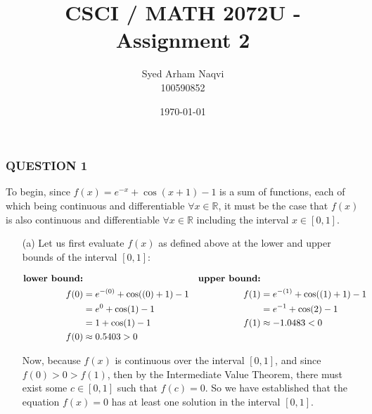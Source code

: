 \documentclass{article}
\title{CSCI / MATH 2072U - Assignment 2}
\author{Syed Arham Naqvi \\ \small{100590852}}
\date{\today}
\begin{document}
\maketitle


\subsubsection*{QUESTION 1}

To begin, since $f(x)=e^{-x}+\cos(x+1)-1$ is a sum of functions, each of which being continuous and differentiable
$\forall x \in \mathbb{R}$, it must be the case that $f(x)$ is also continuous and differentiable $\forall x \in \mathbb{R}$
including the interval $x\in[0,1]$.

\begin{enumerate}

    \item[(a)]  Let us first evaluate $f(x)$ as defined above at the lower and upper bounds of the interval $[0,1]$:

                \begin{align*}
                    \begin{split}
                        \textbf{lower bound:}           \\
                        f(0) &= e^{-(0)}+\cos((0)+1)-1          \\
                             &= e^{0}+\cos(1)-1                 \\
                             &= 1+\cos(1)-1                     \\
                        f(0) &\approx 0.5403 > 0                \\
                    \end{split}
                    \begin{split}
                        \textbf{upper bound:}           \\
                        f(1) &= e^{-(1)}+\cos((1)+1)-1          \\
                             &= e^{-1}+\cos(2)-1                \\
                        f(1) &\approx -1.0483 < 0               \\
                        \vphantom{\text{upper bound ($x=1$):}}  \\
                    \end{split}
                \end{align*}
                
                Now, because $f(x)$ is continuous over the interval $[0,1]$, and since $f(0) > 0 > f(1)$,
                then by the Intermediate Value Theorem, there must exist some $c \in [0,1]$ such that $f(c)=0$.
                So we have established that the equation $f(x)=0$ has at least one solution in the interval $[0,1].$ 


\end{enumerate}
\end{document}
